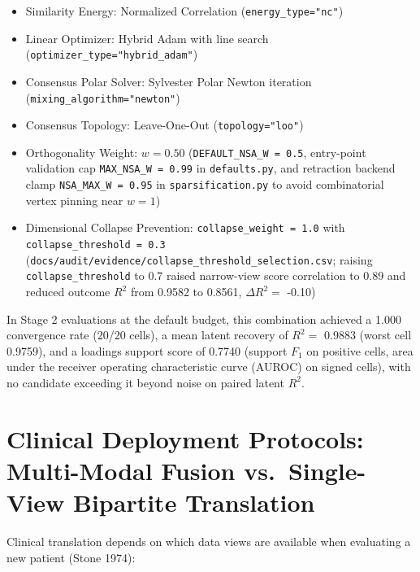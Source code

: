 \documentclass[
  10pt,
  letterpaper,
]{report}
\providecommand{\tightlist}{%
  \setlength{\itemsep}{0pt}\setlength{\parskip}{0pt}}
\begin{document}
\begin{itemize}
  \begin{itemize}
  \tightlist
  \item
    Similarity Energy: Normalized Correlation
    (\texttt{energy\_type="nc"})
  \item
    Linear Optimizer: Hybrid Adam with line search
    (\texttt{optimizer\_type="hybrid\_adam"})
  \item
    Consensus Polar Solver: Sylvester Polar Newton iteration
    (\texttt{mixing\_algorithm="newton"})
  \item
    Consensus Topology: Leave-One-Out (\texttt{topology="loo"})
  \item
    Orthogonality Weight: \(w = 0.50\)
    (\texttt{DEFAULT\_NSA\_W\ =\ 0.5}, entry-point validation cap
    \texttt{MAX\_NSA\_W\ =\ 0.99} in \texttt{defaults.py}, and
    retraction backend clamp \texttt{NSA\_MAX\_W\ =\ 0.95} in
    \texttt{sparsification.py} to avoid combinatorial vertex pinning
    near \(w = 1\))
  \item
    Dimensional Collapse Prevention: \texttt{collapse\_weight\ =\ 1.0}
    with \texttt{collapse\_threshold\ =\ 0.3}
    (\texttt{docs/audit/evidence/collapse\_threshold\_selection.csv};
    raising \texttt{collapse\_threshold} to \(0.7\) raised narrow-view
    score correlation to 0.89 and reduced outcome \(R^2\) from 0.9582 to
    0.8561, \(\Delta R^2 =\) -0.10)
  \end{itemize}
\end{itemize}

In Stage 2 evaluations at the default budget, this combination achieved
a 1.000 convergence rate (20/20 cells), a mean latent recovery of
\(R^2 =\) 0.9883 (worst cell 0.9759), and a loadings support score of
0.7740 (support \(F_1\) on positive cells, area under the receiver
operating characteristic curve (AUROC) on signed cells), with no
candidate exceeding it beyond noise on paired latent \(R^2\).

\section{Clinical Deployment Protocols: Multi-Modal Fusion
vs.~Single-View Bipartite
Translation}\label{clinical-deployment-protocols-multi-modal-fusion-vs.-single-view-bipartite-translation}

Clinical translation depends on which data views are available when
evaluating a new patient (Stone 1974):
\end{document}

